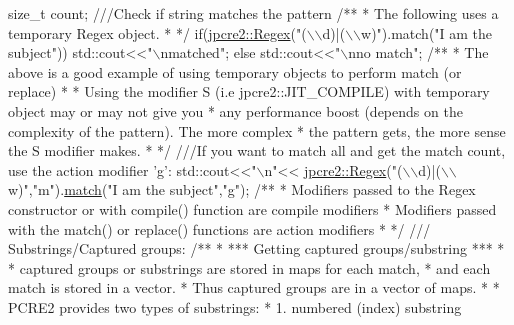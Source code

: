 \begin{DoxyCode}
\textcolor{keywordtype}{size\_t} count;\textcolor{comment}{}
\textcolor{comment}{///Check if string matches the pattern}
\textcolor{comment}{}\textcolor{comment}{/**}
\textcolor{comment}{ * The following uses a temporary Regex object.}
\textcolor{comment}{ * */}
\textcolor{keywordflow}{if}(\hyperlink{classjpcre2_1_1Regex}{jpcre2::Regex}(\textcolor{stringliteral}{"(\(\backslash\)\(\backslash\)d)|(\(\backslash\)\(\backslash\)w)"}).match(\textcolor{stringliteral}{"I am the subject"})) 
    std::cout<<\textcolor{stringliteral}{"\(\backslash\)nmatched"};
\textcolor{keywordflow}{else}
    std::cout<<\textcolor{stringliteral}{"\(\backslash\)nno match"};\textcolor{comment}{}
\textcolor{comment}{/**}
\textcolor{comment}{ * The above is a good example of using temporary objects to perform match (or replace)}
\textcolor{comment}{ * }
\textcolor{comment}{ * Using the modifier S (i.e jpcre2::JIT\_COMPILE) with temporary object may or may not give you}
\textcolor{comment}{ * any performance boost (depends on the complexity of the pattern). The more complex }
\textcolor{comment}{ * the pattern gets, the more sense the S modifier makes.}
\textcolor{comment}{ * */}
\textcolor{comment}{}
\textcolor{comment}{///If you want to match all and get the match count, use the action modifier 'g':}
\textcolor{comment}{}std::cout<<\textcolor{stringliteral}{"\(\backslash\)n"}<<
    \hyperlink{classjpcre2_1_1Regex}{jpcre2::Regex}(\textcolor{stringliteral}{"(\(\backslash\)\(\backslash\)d)|(\(\backslash\)\(\backslash\)w)"},\textcolor{stringliteral}{"m"}).\hyperlink{classjpcre2_1_1Regex_ab93775a93a0a537d09b9e9ab4a5a3894}{match}(\textcolor{stringliteral}{"I am the subject"},\textcolor{stringliteral}{"g"});
\textcolor{comment}{}
\textcolor{comment}{/**}
\textcolor{comment}{ * Modifiers passed to the Regex constructor or with compile() function are compile modifiers}
\textcolor{comment}{ * Modifiers passed with the match() or replace() functions are action modifiers}
\textcolor{comment}{ * */}
\textcolor{comment}{}
\textcolor{comment}{/// Substrings/Captured groups:}
\textcolor{comment}{}\textcolor{comment}{}
\textcolor{comment}{/**}
\textcolor{comment}{ * *** Getting captured groups/substring ***}
\textcolor{comment}{ * }
\textcolor{comment}{ * captured groups or substrings are stored in maps for each match,}
\textcolor{comment}{ * and each match is stored in a vector. }
\textcolor{comment}{ * Thus captured groups are in a vector of maps.}
\textcolor{comment}{ * }
\textcolor{comment}{ * PCRE2 provides two types of substrings:}
\textcolor{comment}{ *  1. numbered (index) substring}

\end{DoxyCode}
